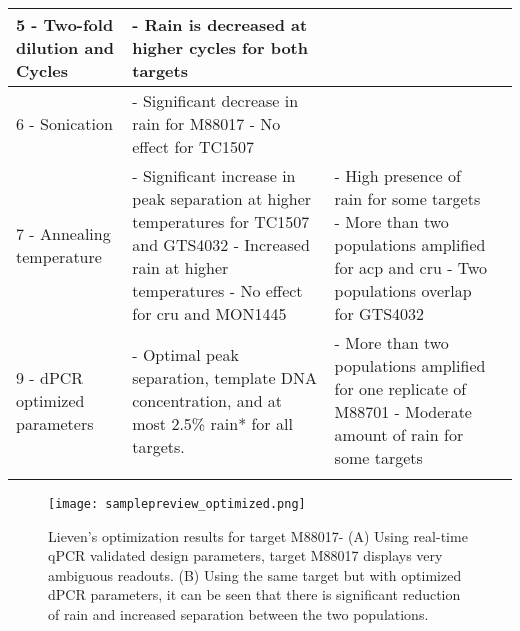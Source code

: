 \begin{table}
\begin{tabularx}{\textwidth}{p{2.7cm}*{3}{X}}
        \hline
        5 - Two-fold dilution and Cycles  & - Rain is decreased at higher   cycles for both targets                                                                                                                                                                     &                                                                                                                                                                                                    \\
        \hline
        6 - Sonication                                                                     & - Significant decrease in rain for   M88017 \newline - No effect for TC1507                                                                                                          &                                                                                                                                                                                                    \\
        \hline
        7 - Annealing temperature        & - Significant increase in peak   separation at higher temperatures for TC1507 and GTS4032 \newline - Increased rain at higher   temperatures \newline - No effect for cru and MON1445 & - High presence of rain for some   targets \newline - More than two populations   amplified for acp and cru \newline- Two populations overlap for   GTS4032 \\
        \hline
        9 - dPCR optimized parameters     & - Optimal peak separation, template   DNA concentration, and at most 2.5\% rain* for all targets.                                                                                                                           & - More than two populations   amplified for one replicate of M88701 \newline - Moderate amount of rain for some   targets                                   \\
        \arrayrulecolor{black}
        \bottomrule    
    \end{tabularx}
\end{table}

\begin{figure}[h]
    \centering
    \texttt{[image: samplepreview\_optimized.png]}
    \caption[Lieven's optimization results for target M88017]%
    {Lieven's optimization results for target M88017- (A) Using real-time qPCR validated design parameters, target M88017 displays very ambiguous readouts. (B) Using the same target but with optimized dPCR parameters, it can be seen that there is significant reduction of rain and increased separation between the two populations.}
     \label{fig:samplepreview_optimized}
\end{figure}

